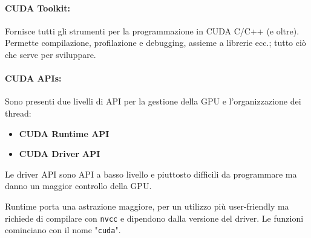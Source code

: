 \paragraph{CUDA Toolkit:} Fornisce tutti gli strumenti per la programmazione in CUDA C/C++ (e oltre). Permette compilazione, profilazione e debugging, assieme a librerie ecc.; tutto ciò che serve per sviluppare.

\paragraph{CUDA APIs:} Sono presenti due livelli di API per la gestione della GPU e l'organizzazione dei thread:
\begin{itemize}
	\item \textbf{CUDA Runtime API}
	\item \textbf{CUDA Driver API}
\end{itemize}
Le driver API sono API a basso livello e piuttosto difficili da programmare ma danno un maggior controllo della GPU.

Runtime porta una astrazione maggiore, per un utilizzo più user-friendly ma richiede di compilare con \texttt{nvcc} e dipendono dalla versione del driver. Le funzioni cominciano con il nome "\texttt{cuda}".